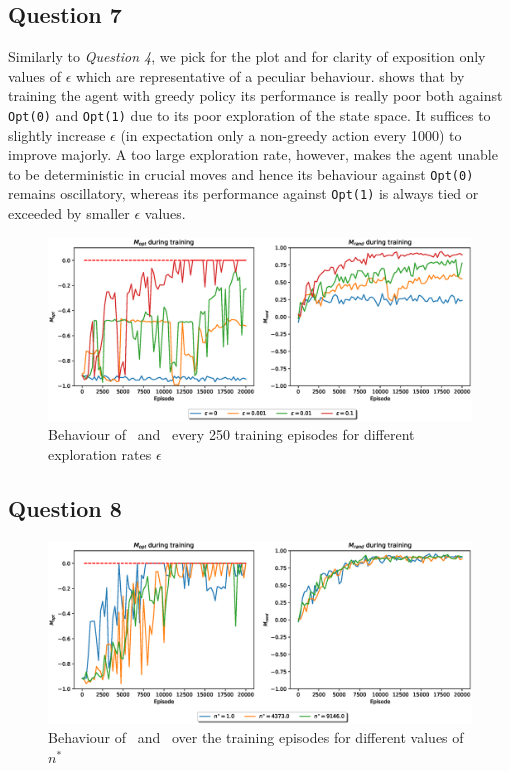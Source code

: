 \documentclass[10pt]{IEEEtran}
\begin{document}
\subsection*{Question 7}
Similarly to \emph{Question 4}, we pick for the plot and for clarity of exposition only values of $\epsilon$ which are representative of a peculiar behaviour.  shows that by training the agent with greedy policy its performance is really poor both against \texttt{Opt(0)} and \texttt{Opt(1)} due to its poor exploration of the state space. It suffices to slightly increase $\epsilon$ (in expectation only a non-greedy action every 1000) to improve majorly. A too large exploration rate, however, makes the agent unable to be deterministic in crucial moves and hence its behaviour against \texttt{Opt(0)} remains oscillatory, whereas its performance against \texttt{Opt(1)} is always tied or exceeded by smaller $\epsilon$ values.
\begin{figure}[H]
    \centering
    \includegraphics[width=\linewidth]{code/figures/performance_epsilon_self.eps}
    \caption{Behaviour of \mopt\ and \mrand\ every 250 training episodes for different exploration rates $\epsilon$}
    \label{plot_question7}
\end{figure}


\subsection*{Question 8}
\begin{figure}[H]
    \centering
    \includegraphics[width=\linewidth]{code/figures/performance_n_star.eps}
    \caption{Behaviour of \mopt\ and \mrand\ over the training episodes for different values of $n^*$}
    \label{fig:my_label}
\end{figure}
\end{document}
